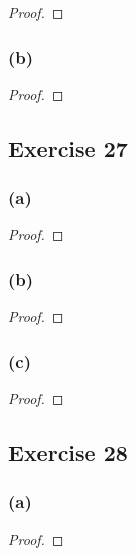 \documentclass[14pt]{extarticle}
\begin{document}
\begin{proof}

\end{proof}

\subsubsection{(b)}

\begin{proof}

\end{proof}

\subsection{Exercise 27}

\subsubsection{(a)}

\begin{proof}

\end{proof}

\subsubsection{(b)}

\begin{proof}

\end{proof}

\subsubsection{(c)}

\begin{proof}

\end{proof}

\subsection{Exercise 28}

\subsubsection{(a)}

\begin{proof}

\end{proof}
\end{document}
